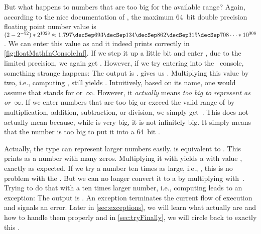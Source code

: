 But what happens to numbers that are too big for the available range?
Again, according to the nice documentation of , the maximum 64~bit double precision floating point number value is~$(2-2^{-52})*2^{1023}\approx1.797\decSep693\decSep134\decSep862\decSep315\decSep708\dots*10^{308}$.
We can enter this value as  and it indeed prints correctly in \cref{fig:floatMathInConsoleInf}.
If we step it up a little bit and enter , due to the limited precision, we again get .
However, if we try entering  into the \python\ console, something strange happens:
The output is .
 gives us .
Multiplying this value by two, i.e., computing , still yields .
Intuitively, based on its name, one would assume that  stands for  or~$\infty$.
However, it \emph{actually} means \emph{too big to represent as  or~$\infty$}.
If we enter numbers that are too big or exceed the valid range of  by multiplication, addition, subtraction, or division, we simply get~.
This does not actually mean  because, while  is very big, it is not infinitely big.
It simply means that the number is too big to put it into a 64~bit .

Actually, the  type can represent larger numbers easily.
 is equivalent to .
This prints as a number with many zeros.
Multiplying it with  yields a  with value , exactly as expected.
If we try a number ten times as large, i.e., , this is no problem with the .
But we can no longer convert it to a  by multiplying with~.
Trying to do that with a ten times larger number, i.e., computing  leads to an exception:
The output is .
An exception terminates the current flow of execution and signals an error.
Later in \cref{sec:exceptions}, we will learn what  actually are and how to handle them properly and in \cref{sec:tryFinally}, we will circle back to exactly this .

